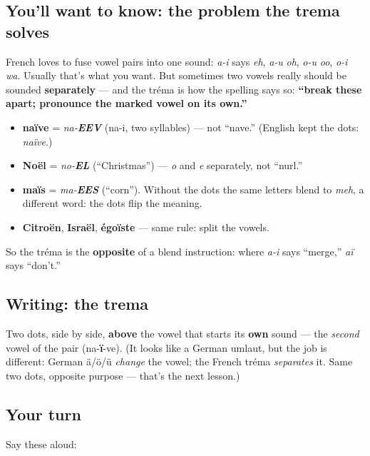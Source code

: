 \subsection*{You'll want to know: the problem the trema solves}
French loves to fuse vowel pairs into one sound: \emph{a-i} says \emph{eh}, \emph{a-u} \emph{oh}, \emph{o-u} \emph{oo}, \emph{o-i} \emph{wa}. Usually that's what you want. But sometimes two vowels really should be sounded \textbf{separately} — and the tréma is how the spelling says so: \textbf{\textquotedblleft{}break these apart; pronounce the marked vowel on its own.\textquotedblright{}}

\begin{itemize}
\raggedright
  \item \textbf{naïve} = \emph{na-\textbf{EEV}} (na-i, two syllables) — not \textquotedblleft{}nave.\textquotedblright{} (English kept the dots: \emph{naïve}.)
  \item \textbf{Noël} = \emph{no-\textbf{EL}} (\textquotedblleft{}Christmas\textquotedblright{}) — \emph{o} and \emph{e} separately, not \textquotedblleft{}nurl.\textquotedblright{}
  \item \textbf{maïs} = \emph{ma-\textbf{EES}} (\textquotedblleft{}corn\textquotedblright{}). Without the dots the same letters blend to \emph{meh}, a different word: the dots flip the meaning.
  \item \textbf{Citroën}, \textbf{Israël}, \textbf{égoïste} — same rule: split the vowels.
\end{itemize}

So the tréma is the \textbf{opposite} of a blend instruction: where \emph{a-i} says \textquotedblleft{}merge,\textquotedblright{} \emph{aï} says \textquotedblleft{}don't.\textquotedblright{}

\subsection*{Writing: the trema}

Two dots, side by side, \textbf{above} the vowel that starts its \textbf{own} sound — the \emph{second} vowel of the pair (na-\textbf{ï}-ve). (It looks like a German umlaut, but the job is different: German ä/ö/ü \emph{change} the vowel; the French tréma \emph{separates} it. Same two dots, opposite purpose — that's the next lesson.)

\subsection*{Your turn}
Say these aloud:

